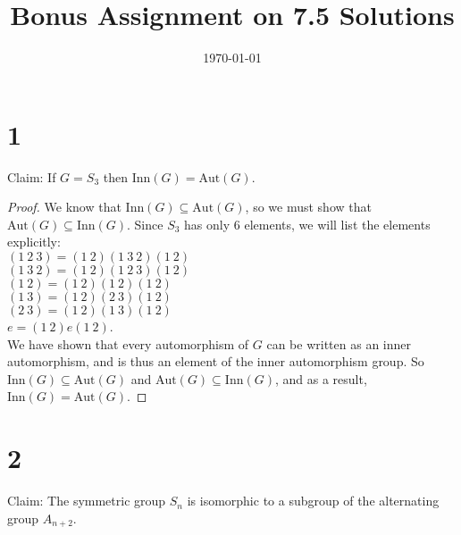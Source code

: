 \documentclass{article}
\title{\textbf{Bonus Assignment on 7.5 Solutions}}
\date{}
\date\today
\begin{document}
\maketitle %

\thispagestyle{firstpage}
\section*{1}
Claim: If $G = S_3$ then $\mathrm{Inn}(G) = \mathrm{Aut}(G)$. 

\begin{proof}
    We know that $\mathrm{Inn}(G) \subseteq \mathrm{Aut}(G)$, so we must show that $\mathrm{Aut}(G) \subseteq \mathrm{Inn}(G)$.  Since $S_3$ has only 6 elements, we will list the elements explicitly: \\

    $(1 \: 2 \: 3) = (1 \: 2)(1 \: 3 \: 2)(1 \: 2)$ \\
    $(1 \: 3 \: 2) = (1 \: 2)(1 \: 2 \: 3)(1 \: 2)$ \\
    $(1 \: 2) = (1 \: 2)(1 \: 2)(1 \: 2)$ \\
    $(1 \: 3) = (1 \: 2)(2 \: 3)(1 \: 2)$ \\
    $(2 \: 3) = (1 \: 2)(1 \: 3)(1 \: 2)$ \\
    $e = (1 \: 2)e(1 \: 2)$. \\

We have shown that every automorphism of $G$ can be written as an inner automorphism, and is thus an element of 
the inner automorphism group.  So $\mathrm{Inn}(G) \subseteq \mathrm{Aut}(G)$ and $\mathrm{Aut}(G) \subseteq \mathrm{Inn}(G)$, and as a result,  
$\mathrm{Inn}(G) = \mathrm{Aut}(G).$
\end{proof}

\section*{2}
Claim: The symmetric group $S_n$ is isomorphic to a subgroup of the alternating group $A_{n+2}$. 
\end{document}
